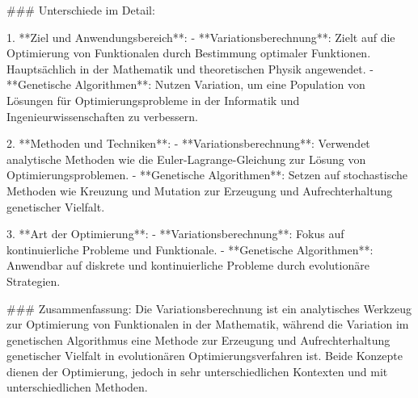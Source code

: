 ### Unterschiede im Detail:

1. **Ziel und Anwendungsbereich**:
   - **Variationsberechnung**: Zielt auf die Optimierung von Funktionalen durch Bestimmung optimaler Funktionen. Hauptsächlich in der Mathematik und theoretischen Physik angewendet.
   - **Genetische Algorithmen**: Nutzen Variation, um eine Population von Lösungen für Optimierungsprobleme in der Informatik und Ingenieurwissenschaften zu verbessern.

2. **Methoden und Techniken**:
   - **Variationsberechnung**: Verwendet analytische Methoden wie die Euler-Lagrange-Gleichung zur Lösung von Optimierungsproblemen.
   - **Genetische Algorithmen**: Setzen auf stochastische Methoden wie Kreuzung und Mutation zur Erzeugung und Aufrechterhaltung genetischer Vielfalt.

3. **Art der Optimierung**:
   - **Variationsberechnung**: Fokus auf kontinuierliche Probleme und Funktionale.
   - **Genetische Algorithmen**: Anwendbar auf diskrete und kontinuierliche Probleme durch evolutionäre Strategien.

### Zusammenfassung:
Die Variationsberechnung ist ein analytisches Werkzeug zur Optimierung von Funktionalen in der Mathematik, während die Variation im genetischen Algorithmus eine Methode zur Erzeugung und Aufrechterhaltung genetischer Vielfalt in evolutionären Optimierungsverfahren ist. Beide Konzepte dienen der Optimierung, jedoch in sehr unterschiedlichen Kontexten und mit unterschiedlichen Methoden.

